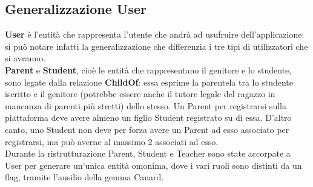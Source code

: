 \documentclass[Lau, binding=0.6cm, oneside]{sapthesis}
\begin{document}
\subsection{Generalizzazione User}
\textbf{User} è l'entità che rappresenta l'utente che andrà ad usufruire dell'applicazione: si può notare infatti la generalizzazione che differenzia i tre tipi di utilizzatori che si avranno.\\
\textbf{Parent} e \textbf{Student}, cioè le entità che rappresentano il genitore e lo studente, sono legate dalla relazione \textbf{ChildOf}: essa esprime la parentela tra lo studente iscritto e il genitore (potrebbe essere anche il tutore legale del ragazzo in mancanza di parenti più stretti) dello stesso. Un Parent per registrarsi sulla piattaforma deve avere almeno un figlio Student registrato su di essa. D'altro canto, uno Student non deve per forza avere un Parent ad esso associato per registrarsi, ma può averne al massimo 2 associati ad esso.\\
Durante la ristrutturazione Parent, Student e Teacher sono state accorpate a User per generare un'unica entità omonima, dove i vari ruoli sono distinti da un flag, tramite l'ausilio della gemma Canard.
\end{document}
